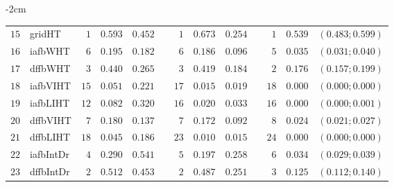 \begin{table*}[!htbp]
\begin{adjustwidth*}{}{-2cm}
\begin{tabular}{@{}rlrrrrrrrrrcc@{}}
\footnotesize{$15$} & \footnotesize{gridHT   } & \footnotesize{$1 $} & \footnotesize{$0.593$} & \footnotesize{$0.452$} && \footnotesize{$1 $} & \footnotesize{$0.673$} & \footnotesize{$0.254$} && \footnotesize{$1 $} & \footnotesize{$0.539$} & \footnotesize{$(0.483;0.599)$} \\
\footnotesize{$16$} & \footnotesize{iafbWHT  } & \footnotesize{$6 $} & \footnotesize{$0.195$} & \footnotesize{$0.182$} && \footnotesize{$6 $} & \footnotesize{$0.186$} & \footnotesize{$0.096$} && \footnotesize{$5 $} & \footnotesize{$0.035$} & \footnotesize{$(0.031;0.040)$} \\
\footnotesize{$17$} & \footnotesize{dffbWHT  } & \footnotesize{$3 $} & \footnotesize{$0.440$} & \footnotesize{$0.265$} && \footnotesize{$3 $} & \footnotesize{$0.419$} & \footnotesize{$0.184$} && \footnotesize{$2 $} & \footnotesize{$0.176$} & \footnotesize{$(0.157;0.199)$} \\
\footnotesize{$18$} & \footnotesize{iafbVIHT } & \footnotesize{$15$} & \footnotesize{$0.051$} & \footnotesize{$0.221$} && \footnotesize{$17$} & \footnotesize{$0.015$} & \footnotesize{$0.019$} && \footnotesize{$18$} & \footnotesize{$0.000$} & \footnotesize{$(0.000;0.000)$} \\
\footnotesize{$19$} & \footnotesize{iafbLIHT } & \footnotesize{$12$} & \footnotesize{$0.082$} & \footnotesize{$0.320$} && \footnotesize{$16$} & \footnotesize{$0.020$} & \footnotesize{$0.033$} && \footnotesize{$16$} & \footnotesize{$0.000$} & \footnotesize{$(0.000;0.001)$} \\
\footnotesize{$20$} & \footnotesize{dffbVIHT } & \footnotesize{$7 $} & \footnotesize{$0.180$} & \footnotesize{$0.137$} && \footnotesize{$7 $} & \footnotesize{$0.172$} & \footnotesize{$0.092$} && \footnotesize{$8 $} & \footnotesize{$0.024$} & \footnotesize{$(0.021;0.027)$} \\
\footnotesize{$21$} & \footnotesize{dffbLIHT } & \footnotesize{$18$} & \footnotesize{$0.045$} & \footnotesize{$0.186$} && \footnotesize{$23$} & \footnotesize{$0.010$} & \footnotesize{$0.015$} && \footnotesize{$24$} & \footnotesize{$0.000$} & \footnotesize{$(0.000;0.000)$} \\
\footnotesize{$22$} & \footnotesize{iafbIntDr} & \footnotesize{$4 $} & \footnotesize{$0.290$} & \footnotesize{$0.541$} && \footnotesize{$5 $} & \footnotesize{$0.197$} & \footnotesize{$0.258$} && \footnotesize{$6 $} & \footnotesize{$0.034$} & \footnotesize{$(0.029;0.039)$} \\
\footnotesize{$23$} & \footnotesize{dffbIntDr} & \footnotesize{$2 $} & \footnotesize{$0.512$} & \footnotesize{$0.453$} && \footnotesize{$2 $} & \footnotesize{$0.487$} & \footnotesize{$0.251$} && \footnotesize{$3 $} & \footnotesize{$0.125$} & \footnotesize{$(0.112;0.140)$} \\

\end{tabular}
\end{adjustwidth*}
\end{table*}
